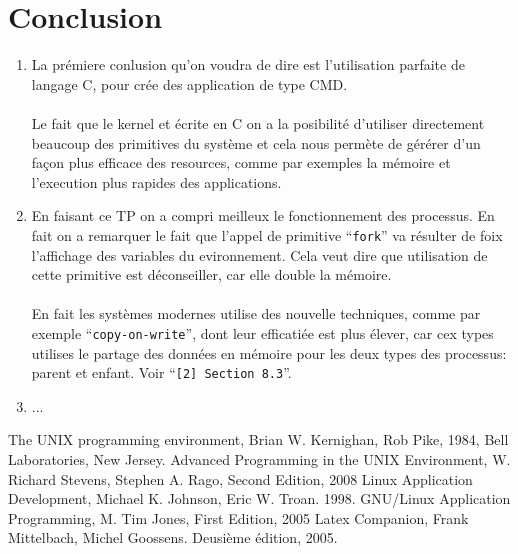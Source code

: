 \documentclass{article}
\begin{document}
\section{Conclusion}
\begin{enumerate}
\item La prémiere conlusion qu'on voudra de dire est l'utilisation parfaite de langage C, 
pour crée des application de type CMD. 
\\\\Le fait que le kernel et écrite en C on a la posibilité d'utiliser directement beaucoup 
des primitives du système et cela nous permète de gérérer d'un façon plus efficace des resources,
comme par exemples la mémoire et l'execution plus rapides des applications.
\item En faisant ce TP on a compri meilleux le fonctionnement des processus. En fait on a 
remarquer le fait que l'appel de primitive ``\texttt{fork}'' va résulter de foix l'affichage
des variables du evironnement. Cela veut dire que utilisation de cette primitive est déconseiller,
car elle double la mémoire. 
\\\\
En fait les systèmes modernes utilise des nouvelle techniques, comme par exemple 
``\texttt{copy-on-write}'', dont leur efficatiée est plus élever, car cex types utilises 
le partage des données en mémoire pour les deux types des processus: parent et enfant.
Voir ``\texttt{[2] Section 8.3}''.
\item ...

\end{enumerate}

\newpage
\begin{thebibliography}{5}

  The UNIX programming environment, 
  Brian W. Kernighan, Rob Pike,
  1984, Bell Laboratories, New Jersey. 
  Advanced Programming in the UNIX Environment, 
  W. Richard Stevens, Stephen A. Rago,
  Second Edition, 2008  
  Linux Application Development,
  Michael K. Johnson, Eric W. Troan.
  1998.
  GNU/Linux Application Programming, 
  M. Tim Jones,
  First Edition, 2005  
  Latex Companion,
  Frank Mittelbach, Michel Goossens.
  Deusième édition, 2005.  

\end{thebibliography}
\end{document}
